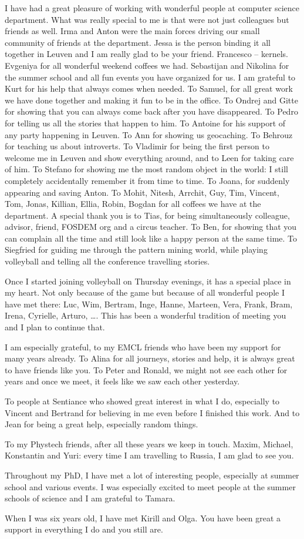 I have had a great pleasure of working with wonderful people at computer science department. What was really special to me is that were not just colleagues but friends as well. Irma and Anton were the main forces driving our small community of friends at the department. Jessa is the person binding it all together in Leuven and I am really glad to be your friend. Francesco -- kernels. Evgeniya for all wonderful weekend coffees we had. Sebastijan and Nikolina for the summer school and all fun events you have organized for us. I am grateful to Kurt for his help that always comes when needed. To Samuel, for all great work we have done together and making it fun to be in the office. To Ondrej and Gitte for showing that you can always come back after you have disappeared. To Pedro for telling us all the stories that happen to him. To Antoine for his support of any party happening in Leuven. To Ann for showing us geocaching. To Behrouz for teaching us about introverts. To Vladimir for being the first person to welcome me in Leuven and show everything around, and to Leen for taking care of him. To Stefano for showing me the most random object in the world: I still completely accidentally remember it from time to time. To Joana, for suddenly appearing and saving Anton. To Mohit, Nitesh, Arrchit, Guy, Tim, Vincent, Tom, Jonas, Killian, Ellia, Robin, Bogdan for all coffees we have at the department. A special thank you is to Tias, for being simultaneously colleague, advisor, friend, FOSDEM org and a circus teacher. To Ben, for showing that you can complain all the time and still look like a happy person at the same time. To Siegfried for guiding me through the pattern mining world, while playing volleyball and telling all the conference travelling stories.

Once I started joining volleyball on Thursday evenings, it has a special place in my heart. Not only because of the game but because of all wonderful people I have met there: Luc, Wim, Bertram, Inge, Hanne, Marteen, Vera, Frank, Bram, Irena, Cyrielle, Arturo, \dots . This has been a wonderful tradition of meeting you and I plan to continue that. 

I am especially grateful, to my EMCL friends who have been my support for many years already. To Alina for all journeys, stories and help, it is always great to have friends like you. To Peter and Ronald, we might not see each other for years and once we meet, it feels like we saw each other yesterday. 

To people at Sentiance who showed great interest in what I do, especially to Vincent and Bertrand for believing in me even before I finished this work. And to Jean for being a great help, especially random things.

To my Phystech friends, after all these years we keep in touch. Maxim, Michael, Konstantin and Yuri: every time I am travelling to Russia, I am glad to see you.

Throughout my PhD, I have met a lot of interesting people, especially at summer school and various events. I was especially excited to meet people at the summer schools of science and I am grateful to Tamara.

When I was six years old, I have met Kirill and Olga. You have been great a support in everything I do and you still are.
